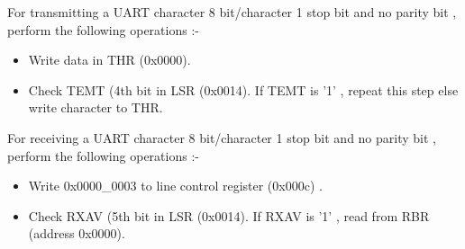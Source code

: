 \documentclass[12pt,a4paper]{report}
\begin{document}
For transmitting a UART character 8 bit/character 1 stop bit and no parity bit , perform the following operations :-

\begin{itemize} 
\item Write data in THR (0x0000).
\item Check TEMT (4th bit in LSR (0x0014). If TEMT is '1' , repeat this step else write character to THR.
\end{itemize}

For receiving a UART character 8 bit/character 1 stop bit and no parity bit , perform the following operations :-

\begin{itemize} 
\item Write 0x0000\_0003 to line control register (0x000c) .
\item Check RXAV (5th bit in LSR (0x0014). If RXAV is '1' , read from RBR (address 0x0000).

\end{itemize}
\end{document}
